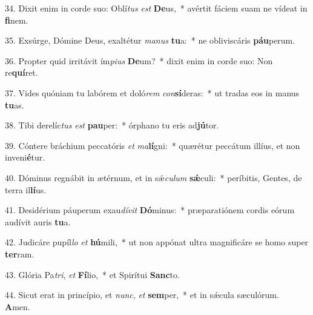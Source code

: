 34. Dixit enim in corde suo: Oblí\textit{tus} \textit{est} \textbf{De}us,~*  avértit fáciem suam ne vídeat in \textbf{fi}nem.\

35. Exsúrge, Dómine Deus, exaltétur \textit{ma}\textit{nus} \textbf{tu}a:~*  ne obliviscáris \textbf{páu}perum.\

36. Propter quid irritávit ím\textit{pi}\textit{us} \textbf{De}um?~*  dixit enim in corde suo: Non re\textbf{quí}ret.\

37. Vides quóniam tu labórem et doló\textit{rem} \textit{con}\textbf{sí}deras:~*  ut tradas eos in manus \textbf{tu}as.\

38. Tibi derelíc\textit{tus} \textit{est} \textbf{pau}per:~*  órphano tu eris ad\textbf{jú}tor.\

39. Cóntere bráchium peccatóris \textit{et} \textit{ma}\textbf{lí}gni:~*  quærétur peccátum illíus, et non inveni\textbf{é}tur.\

40. Dóminus regnábit in ætérnum, et in sǽ\textit{cu}\textit{lum} \textbf{sǽ}culi:~*  períbitis, Gentes, de terra il\textbf{lí}us.\

41. Desidérium páuperum exau\textit{dí}\textit{vit} \textbf{Dó}minus:~*  præparatiónem cordis eórum audívit auris \textbf{tu}a.\

42. Judicáre pupíl\textit{lo} \textit{et} \textbf{hú}mili,~*  ut non appónat ultra magnificáre se homo super \textbf{ter}ram.\

43. Glória Pa\textit{tri}, \textit{et} \textbf{Fí}lio,~*  et Spirítui \textbf{Sanc}to.\

44. Sicut erat in princípio, et \textit{nunc}, \textit{et} \textbf{sem}per,~*  et in sǽcula sæculórum. \textbf{A}men.\


